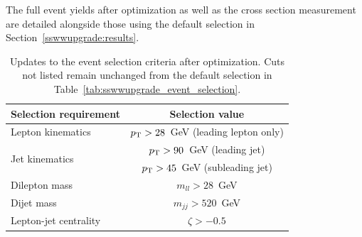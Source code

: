 The full event yields after optimization as well as the cross section measurement are detailed alongside those using the default selection in Section~\ref{sswwupgrade:results}.


\begin{table}[htb]
  \centering
  \begin{tabular}{l|c}
    Selection requirement              & Selection value \\
    \hline\hline
    Lepton kinematics                  & $p_{\mathrm{T}} > 28$~GeV (leading lepton only) \\
    \multirow{2}{*}{Jet kinematics}    & $p_{\mathrm{T}} > 90$~GeV (leading jet) \\
                                       & $p_{\mathrm{T}} > 45$~GeV (subleading jet) \\
    \hline
    Dilepton mass                      & $m_{ll} > 28$~GeV \\
    Dijet mass                         & $m_{jj} > 520$~GeV \\
    Lepton-jet centrality              & $\zeta > -0.5$ \\
    \hline
  \end{tabular}
  \caption{Updates to the \ssww event selection criteria after optimization.  Cuts not listed remain unchanged from the default selection in Table~\ref{tab:sswwupgrade_event_selection}.}
  \label{tab:sswwupgrade_optimized_selection}
\end{table}

